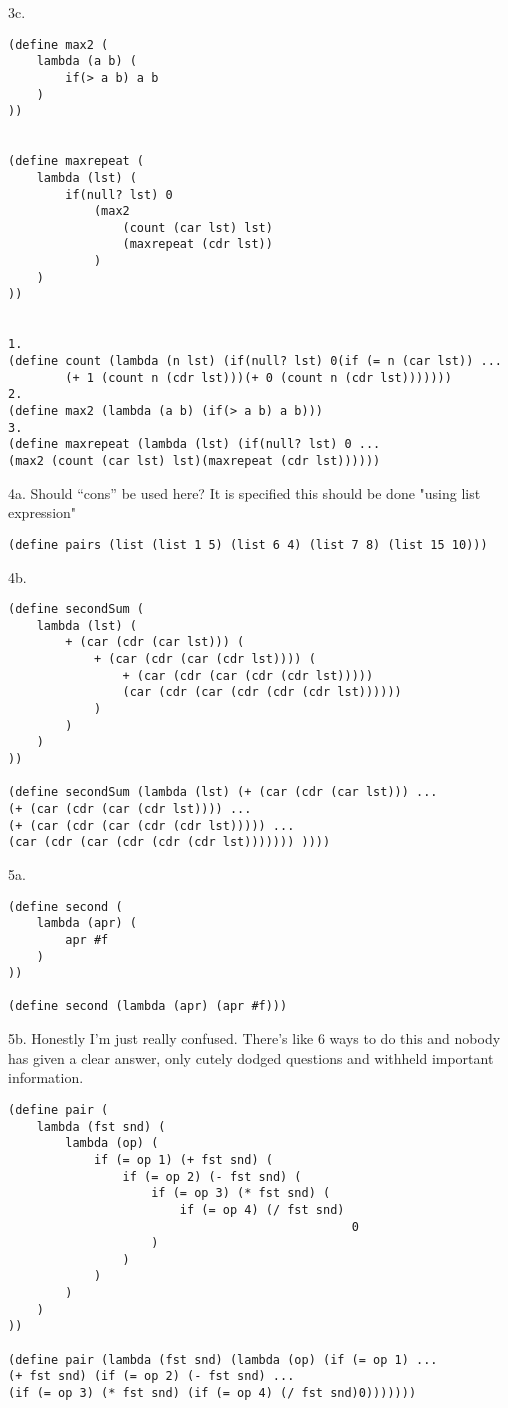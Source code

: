 \documentclass[12pt]{article}
\begin{document}
\noindent 3c.
\begin{lstlisting}
(define max2 (
	lambda (a b) (
		if(> a b) a b
	)
))


(define maxrepeat (
	lambda (lst) (
		if(null? lst) 0
			(max2 
				(count (car lst) lst)
				(maxrepeat (cdr lst))
			)
	)
))


1.
(define count (lambda (n lst) (if(null? lst) 0(if (= n (car lst)) ...
		(+ 1 (count n (cdr lst)))(+ 0 (count n (cdr lst)))))))
2.
(define max2 (lambda (a b) (if(> a b) a b)))
3.
(define maxrepeat (lambda (lst) (if(null? lst) 0 ...
(max2 (count (car lst) lst)(maxrepeat (cdr lst))))))
\end{lstlisting}

\pagebreak

\noindent 4a.
Should ``cons'' be used here? It is specified this should be done "using list expression"
\begin{lstlisting}
(define pairs (list (list 1 5) (list 6 4) (list 7 8) (list 15 10)))
\end{lstlisting}


\noindent 4b.
\begin{lstlisting}
(define secondSum (
	lambda (lst) (
		+ (car (cdr (car lst))) (
			+ (car (cdr (car (cdr lst)))) (
				+ (car (cdr (car (cdr (cdr lst)))))
				(car (cdr (car (cdr (cdr (cdr lst))))))
			) 
		)
	)
))

(define secondSum (lambda (lst) (+ (car (cdr (car lst))) ...
(+ (car (cdr (car (cdr lst)))) ...
(+ (car (cdr (car (cdr (cdr lst))))) ...
(car (cdr (car (cdr (cdr (cdr lst))))))) ))))
\end{lstlisting}

\pagebreak

\noindent 5a.
\begin{lstlisting}
(define second (
	lambda (apr) (
		apr #f
	)
))

(define second (lambda (apr) (apr #f)))
\end{lstlisting}

\noindent 5b.
Honestly I'm just really confused. There's like 6 ways to do this and nobody has given a clear answer, only cutely dodged questions and withheld important information.
\begin{lstlisting}
(define pair (
    lambda (fst snd) (
        lambda (op) (
            if (= op 1) (+ fst snd) (
                if (= op 2) (- fst snd) (
                    if (= op 3) (* fst snd) (
                        if (= op 4) (/ fst snd)
                                                0
                    )
                )
            )
        )
    )
))

(define pair (lambda (fst snd) (lambda (op) (if (= op 1) ...
(+ fst snd) (if (= op 2) (- fst snd) ...
(if (= op 3) (* fst snd) (if (= op 4) (/ fst snd)0)))))))
\end{lstlisting}
\end{document}
